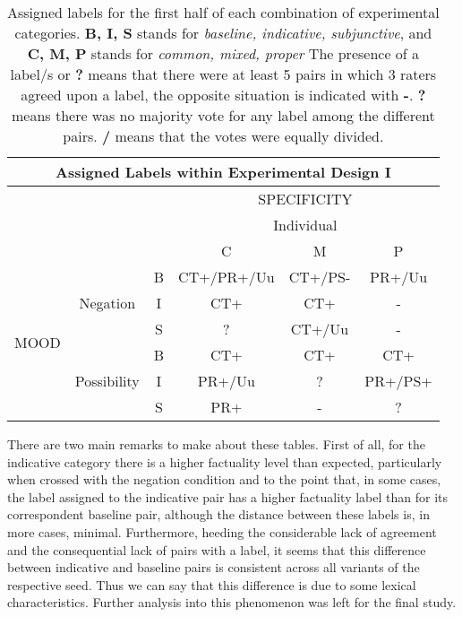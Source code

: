 \begin{table}[h!]
\centering
\begin{tabular}{|c|c|c|c|c|c|}
\hline
\multicolumn{6}{|c|}{Assigned Labels within Experimental Design I}\\\hline
& & &\multicolumn{3}{c|}{SPECIFICITY} \\\cline{4-6}
& & &\multicolumn{3}{c|}{Individual}\\\cline{4-6} 
                     & & & C & M & P \\\hline
\multirow{6}{*}{MOOD} &\multirow{3}{*}{Negation} & B & CT+/PR+/Uu & CT+/PS- & PR+/Uu \\\cline{3-6}
&& I & CT+ & CT+ & - \\\cline{3-6}
&& S & ? & CT+/Uu & - \\\cline{2-6}
&\multirow{3}{*}{Possibility}& B & CT+ & CT+ & CT+ \\\cline{3-6}
&& I & PR+/Uu & ? & PR+/PS+ \\\cline{3-6}
&& S & PR+ & - & ? \\ 
\hline
\end{tabular}
\caption[Assigned labels I.]{Assigned labels for the first half of each combination of experimental categories. \textbf{B, I, S} stands for \textit{baseline, indicative, subjunctive}, and \textbf{C, M, P} stands for \textit{common, mixed, proper} The presence of a label/s or \textbf{?} means that there were at least 5 pairs in which 3 raters agreed upon a label, the opposite situation is indicated with \textbf{-}. \textbf{?} means there was no majority vote for any label among the different pairs. \textbf{/} means that the votes were equally divided.}
\label{tab:ass1}
\end{table}

There are two main remarks to make about these tables. First of all, for the indicative category there is a higher factuality level than expected, particularly when crossed with the negation condition and to the point that, in some cases, the label assigned to the indicative pair has a higher factuality label than for its correspondent baseline pair, although the distance between these labels is, in more cases, minimal. Furthermore, heeding the considerable lack of agreement and the consequential lack of pairs with a label, it seems that this difference between indicative and baseline pairs is consistent across all variants of the respective seed. Thus we can say that this difference is due to some lexical characteristics. Further analysis into this phenomenon was left for the final study.\\

